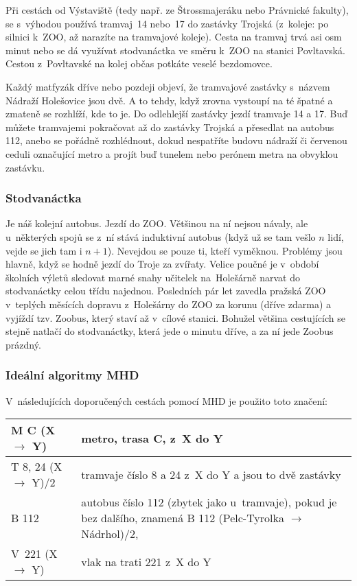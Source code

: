 Při cestách od Výstaviště (tedy např. ze Štrossmajeráku nebo
Právnické fakulty), se s~výhodou používá tramvaj~14 nebo~17 do
zastávky Trojská (z~koleje: po silnici k~ZOO, až narazíte na
tramvajové koleje). Cesta na tramvaj trvá asi osm minut nebo se dá
využívat stodvanáctka ve směru k~ZOO na stanici Povltavská. Cestou z~Povltavské na kolej občas potkáte veselé bezdomovce.

Každý matfyzák dříve nebo pozdeji objeví, že tramvajové zastávky s~názvem Nádraží Holešovice jsou dvě. A to tehdy, když zrovna vystoupí na té špatné a zmateně se rozhlíží, kde to je. Do odlehlejší zastávky jezdí tramvaje 14 a 17. Buď můžete tramvajemi pokračovat až do zastávky Trojská a přesedlat na autobus 112, anebo se pořádně rozhlédnout, dokud nespatříte budovu nádraží či červenou ceduli označující metro a projít buď tunelem nebo perónem metra na obvyklou zastávku.

\subsubsection {Stodvanáctka}

Je náš kolejní autobus. Jezdí do ZOO. Většinou na ní nejsou
návaly, ale u~některých spojů se z~ní stává induktivní autobus
(když už se tam vešlo $n$ lidí, vejde se jich tam i $n+1$).
Nevejdou se pouze ti, kteří vyměknou. Problémy jsou hlavně, když
se hodně jezdí do Troje za zvířaty. Velice poučné je v~období
školních výletů sledovat marné snahy učitelek na~Holešárně narvat
do stodvanáctky celou třídu najednou. Posledních pár let zavedla
pražská ZOO v~teplých měsících dopravu z~Holešárny do ZOO za
korunu (dříve zdarma) a vyjíždí tzv. Zoobus, který staví až
v~cílové stanici. Bohužel většina cestujících se stejně natlačí do
stodvanáctky, která jede o minutu dříve, a za ní jede Zoobus
prázdný.

\subsubsection{Ideální algoritmy MHD}

\def\startpath{B 112, M C (Nádrhol \ra }
\def\ra{$\rightarrow$}

V~následujících doporučených cestách pomocí MHD je použito toto
značení:

\smallskip

\noindent\begin{tabularx}{\textwidth}{ l|X }
     M C (X $\rightarrow$ Y) & metro,  trasa C, z~X do Y \\ \hline
     T 8, 24 (X $\rightarrow$ Y)/2 & tramvaje číslo 8 a 24 z~X do Y a jsou to dvě zastávky \\ \hline
      B 112 &  autobus číslo 112 (zbytek jako u~tramvaje), pokud je
      bez dalšího, znamená B 112 (Pelc-Tyrolka $\rightarrow$ Nádrhol)/2, \\ \hline
      V~221 (X $\rightarrow$ Y) & vlak na trati 221 z~X do Y \\     
\end{tabularx}

